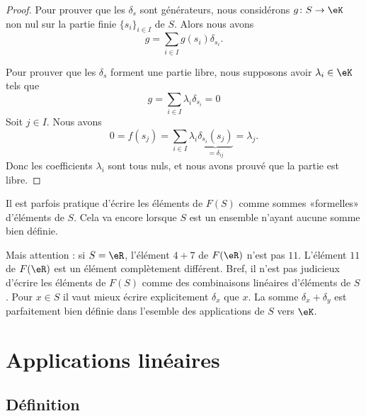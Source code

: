 \begin{proof}
    Pour prouver que les \( \delta_s\) sont générateurs, nous considérons \( g\colon S\to \eK\) non nul sur la partie finie \( \{ s_i \}_{i\in I}\) de \( S\). Alors nous avons
    \begin{equation}
        g=\sum_{i\in I}g(s_i)\delta_{s_i}.
    \end{equation}
    
    Pour prouver que les \( \delta_s\) forment une partie libre, nous supposons avoir \( \lambda_i\in \eK\) tels que
    \begin{equation}
        g=\sum_{i\in I}\lambda_i\delta_{s_i}=0
    \end{equation}
    Soit \( j\in I\). Nous avons
    \begin{equation}
        0=f(s_j)=\sum_{i\in I}\lambda_i \underbrace{\delta_{s_i}(s_j)}_{=\delta_{ij}}=\lambda_j.
    \end{equation}
    Donc les coefficients \( \lambda_i\) sont tous nuls, et nous avons prouvé que la partie est libre.
\end{proof}

Il est parfois pratique d'écrire les éléments de \( F(S)\) comme sommes «formelles» d'éléments de \( S\). Cela va encore lorsque \( S\) est un ensemble n'ayant aucune somme bien définie. 

Mais attention : si \( S=\eR\), l'élément \( 4+7\) de \( F(\eR)\) n'est pas \( 11\). L'élément \( 11\) de \( F(\eR)\) est un élément complètement différent. Bref, il n'est pas judicieux d'écrire les éléments de \( F(S)\) comme des combinaisons linéaires d'éléments de \( S\). Pour \( x\in S\) il vaut mieux écrire explicitement \( \delta_x\) que \( x\). La somme \( \delta_x+\delta_y\) est parfaitement bien définie dans l'esemble des applications de \( S\) vers \( \eK\).

\section{Applications linéaires}

\subsection{Définition}

